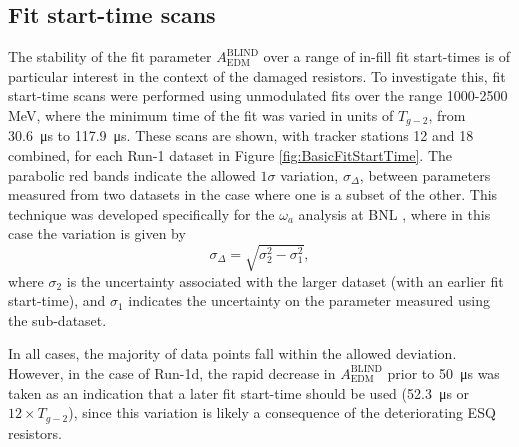\subsection{Fit start-time scans}\label{sec:FitStartTimeScans}

The stability of the fit parameter $A_{\text{EDM}}^{\text{BLIND}}$ over a range of in-fill fit start-times is of particular interest in the context of the damaged resistors. To investigate this, fit start-time scans were performed using unmodulated fits over the range 1000-2500 MeV, where the minimum time of the fit was varied in units of $T_{g-2}$, from \SI{30.6}{\micro\second} to \SI{117.9}{\micro\second}. These scans are shown, with tracker stations 12 and 18 combined, for each Run-1 dataset in Figure \ref{fig:BasicFitStartTime}. The parabolic red bands indicate the allowed $1\sigma$ variation, $\sigma_{\Delta}$, between parameters measured from two datasets in the case where one is a subset of the other. This technique was developed specifically for the $\omega_{a}$ analysis at BNL \cite{BNLFinalReport}, where in this case the variation is given by
%
\begin{equation}
  \sigma_{\Delta} = \sqrt{\sigma_{2}^{2} - \sigma_{1}^{2}},
  \label{eqn:Kawall}
\end{equation}
%
where $\sigma_{2}$ is the uncertainty associated with the larger dataset (with an earlier fit start-time), and $\sigma_{1}$ indicates the uncertainty on the parameter measured using the sub-dataset. 

In all cases, the majority of data points fall within the allowed deviation. However, in the case of Run-1d, the rapid decrease in $A_{\text{EDM}}^{\text{BLIND}}$ prior to \SI{50}{\micro\second} was taken as an indication that a later fit start-time should be used (\SI{52.3}{\micro\second} or $12\times T_{g-2}$), since this variation is likely a consequence of the deteriorating ESQ resistors. 

